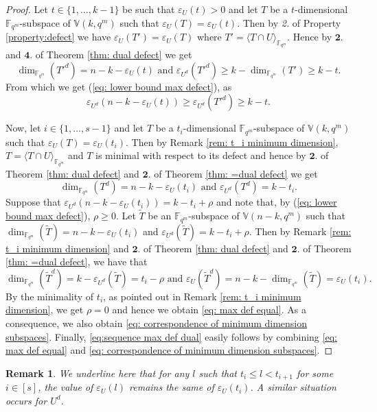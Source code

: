 \documentclass[11pt]{amsart}
\newtheorem{remark}[theorem]{Remark}
\newcommand{\fqm}{\mathbb{F}_{q^m}}
\begin{document}
\begin{proof}
  Let $t\in \{1,\dots,k-1\}$ be such that $\varepsilon_U(t)>0$ and let $T$ be a $t$-dimensional $\fqm$-subspace of $\mathbb{V}(k,q^m)$ such that  $\varepsilon_U(T)=\varepsilon_U(t)$. Then by {\it 2.} of Property \ref{property:defect} we have $\varepsilon_U(T')=\varepsilon_U(T)$ where $T'=\langle T\cap U\rangle_{\fqm}$. Hence by $\mathbf 2.$ and $\mathbf 4.$ of Theorem \ref{thm: dual defect} we get
  \[\dim_{\fqm} (T'^d)=n-k-\varepsilon_U(t) \,\, \mbox{and} \,\, \varepsilon_{U^d} (T'^d)\geq k-\dim_{\fqm} (T')\geq k-t. \]
From which we get (\ref{eq: lower bound max defect}), as
  \[\varepsilon_{U^d} (n-k-\varepsilon_U(t))\geq \varepsilon_{U^d} (T'^d)\geq k-t.\]

  Now, let $i\in \{1,\dots, s-1\}$ and let $T$ be a $t_i$-dimensional $\fqm$-subspace of $\mathbb{V}(k,q^m)$ such that  $\varepsilon_U(T)=\varepsilon_U(t_i)$. Then by Remark \ref{rem: t_i minimum dimension}, $T=\langle T\cap U\rangle_{\fqm}$ and $T$ is minimal with respect to its defect and hence by $\mathbf 2.$ of Theorem \ref{thm: dual defect} and $\mathbf 2.$ of Theorem \ref{thm: =dual defect} we get 
   \[\dim_{\fqm} (T^d)=n-k-\varepsilon_U(t_i) \,\, \mbox{and} \,\,
 \varepsilon_{U^d} (T^d)=  k-t_i.\]
Suppose that $\varepsilon_{U^d} (n-k-\varepsilon_U(t_i))=  k-t_i+\rho$ and note that, by (\ref{eq: lower bound max defect}),  $\rho \geq 0$. Let $\tilde{T}$ be an $\fqm$-subspace of $\mathbb{V}(n-k,q^m)$ such that $\dim_{\fqm} (\tilde{T})=n-k-\varepsilon_U(t_i)$ and  $\varepsilon_{U^d} (\tilde{T})=  k-t_i+\rho$. Then by Remark \ref{rem: t_i minimum dimension} and $\mathbf 2.$ of Theorem \ref{thm: dual defect} and $\mathbf 2.$ of Theorem \ref{thm: =dual defect}, we have that 
\[\dim_{\fqm} (\tilde{T}^d)=k-\varepsilon_{U^d}(\tilde{T})=t_i-\rho \,\, \mbox{and} \,\,
 \varepsilon_{U} (\tilde{T}^d)= n-k- \dim_{\fqm} (\tilde{T})=\varepsilon_U(t_i).\]
 By the minimality of $t_i$, as pointed out in Remark \ref{rem: t_i minimum dimension}, we get $\rho =0$ and hence we obtain \eqref{eq: max def equal}. 
As a consequence, we also obtain \eqref{eq: correspondence of minimum dimension subspaces}.
Finally, \eqref{eq:sequence max def dual} easily follows by combining  \eqref{eq: max def equal} and  \eqref{eq: correspondence of minimum dimension subspaces}.
  \end{proof}

\begin{remark}
    We underline here that for any $l$ such that $t_i\leq l < t_{i+1}$ for some $i \in [s]$, the value of $\varepsilon_U(l)$ remains the same of $\varepsilon_U(t_i)$. A similar situation occurs for $U^d$.
\end{remark}
\end{document}
